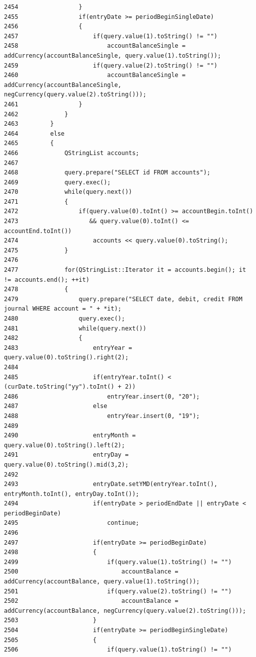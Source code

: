 \begin{verbatim}
2454                 }
2455                 if(entryDate >= periodBeginSingleDate)
2456                 {
2457                     if(query.value(1).toString() != "")
2458                         accountBalanceSingle = addCurrency(accountBalanceSingle, query.value(1).toString());
2459                     if(query.value(2).toString() != "")
2460                         accountBalanceSingle = addCurrency(accountBalanceSingle, negCurrency(query.value(2).toString()));
2461                 }
2462             }
2463         }
2464         else
2465         {
2466             QStringList accounts;
2467 
2468             query.prepare("SELECT id FROM accounts");
2469             query.exec();
2470             while(query.next())
2471             {
2472                 if(query.value(0).toInt() >= accountBegin.toInt()
2473                    && query.value(0).toInt() <= accountEnd.toInt())
2474                     accounts << query.value(0).toString();
2475             }
2476 
2477             for(QStringList::Iterator it = accounts.begin(); it != accounts.end(); ++it)
2478             {
2479                 query.prepare("SELECT date, debit, credit FROM journal WHERE account = " + *it);
2480                 query.exec();
2481                 while(query.next())
2482                 {
2483                     entryYear = query.value(0).toString().right(2);
2484 
2485                     if(entryYear.toInt() < (curDate.toString("yy").toInt() + 2))
2486                         entryYear.insert(0, "20");
2487                     else
2488                         entryYear.insert(0, "19");
2489 
2490                     entryMonth = query.value(0).toString().left(2);
2491                     entryDay = query.value(0).toString().mid(3,2);
2492 
2493                     entryDate.setYMD(entryYear.toInt(), entryMonth.toInt(), entryDay.toInt());
2494                     if(entryDate > periodEndDate || entryDate < periodBeginDate)
2495                         continue;
2496 
2497                     if(entryDate >= periodBeginDate)
2498                     {
2499                         if(query.value(1).toString() != "")
2500                             accountBalance = addCurrency(accountBalance, query.value(1).toString());
2501                         if(query.value(2).toString() != "")
2502                             accountBalance = addCurrency(accountBalance, negCurrency(query.value(2).toString()));
2503                     }
2504                     if(entryDate >= periodBeginSingleDate)
2505                     {
2506                         if(query.value(1).toString() != "")

\end{verbatim}
